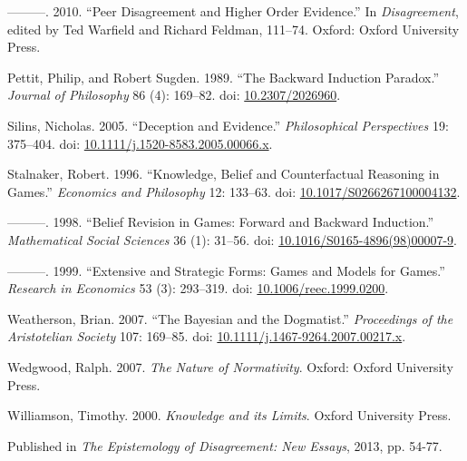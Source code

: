 \documentclass[
  10pt,
  letterpaper,
  DIV=11,
  numbers=noendperiod,
  twoside]{scrartcl}
\newlength{\cslhangindent}
\newenvironment{CSLReferences}[2] %
 {\begin{list}{}{%
  \setlength{\itemindent}{0pt}
  \setlength{\leftmargin}{0pt}
  \setlength{\parsep}{0pt}
  \ifodd #1
   \setlength{\leftmargin}{\cslhangindent}
   \setlength{\itemindent}{-1\cslhangindent}
  \fi
  \setlength{\itemsep}{#2\baselineskip}}}
 {\end{list}}
\begin{document}
\begin{CSLReferences}{1}{0}
---------. 2010. {``Peer Disagreement and Higher Order Evidence.''} In
\emph{Disagreement}, edited by Ted Warfield and Richard Feldman,
111--74. Oxford: Oxford University Press.

Pettit, Philip, and Robert Sugden. 1989. {``The Backward Induction
Paradox.''} \emph{Journal of Philosophy} 86 (4): 169--82. doi:
\href{https://doi.org/10.2307/2026960}{10.2307/2026960}.

Silins, Nicholas. 2005. {``Deception and Evidence.''}
\emph{Philosophical Perspectives} 19: 375--404. doi:
\href{https://doi.org/10.1111/j.1520-8583.2005.00066.x}{10.1111/j.1520-8583.2005.00066.x}.

Stalnaker, Robert. 1996. {``Knowledge, Belief and Counterfactual
Reasoning in Games.''} \emph{Economics and Philosophy} 12: 133--63. doi:
\href{https://doi.org/10.1017/S0266267100004132}{10.1017/S0266267100004132}.

---------. 1998. {``Belief Revision in Games: Forward and Backward
Induction.''} \emph{Mathematical Social Sciences} 36 (1): 31--56. doi:
\href{https://doi.org/10.1016/S0165-4896(98)00007-9}{10.1016/S0165-4896(98)00007-9}.

---------. 1999. {``Extensive and Strategic Forms: Games and Models for
Games.''} \emph{Research in Economics} 53 (3): 293--319. doi:
\href{https://doi.org/10.1006/reec.1999.0200}{10.1006/reec.1999.0200}.

Weatherson, Brian. 2007. {``The Bayesian and the Dogmatist.''}
\emph{Proceedings of the Aristotelian Society} 107: 169--85. doi:
\href{https://doi.org/10.1111/j.1467-9264.2007.00217.x}{10.1111/j.1467-9264.2007.00217.x}.

Wedgwood, Ralph. 2007. \emph{The Nature of Normativity}. Oxford: Oxford
University Press.

Williamson, Timothy. 2000. \emph{{Knowledge and its Limits}}. Oxford
University Press.

\end{CSLReferences}



\noindent Published in\emph{
The Epistemology of Disagreement: New Essays}, 2013, pp. 54-77.
\end{document}
